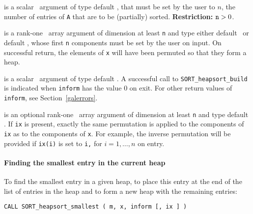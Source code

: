 \documentclass{galahad}
\newcommand{\packagename}{SORT}
\begin{document}
\vspace*{-3mm}
\begin{description}
 is a scalar \intentin\ argument of type default
\integer, that must be set by the user to $n$, the 
number of entries of {\tt A} that are to be (partially) sorted. 
{\bf Restriction:} ${\tt n} > 0$. 
 
 is a rank-one \intentinout\ array argument of
dimension at least {\tt n} and type either default
\integer\ or default \realdp, whose first {\tt n} components  must be set by
the user on input. On successful return, the elements of {\tt x} will have 
been permuted so that they form a heap. 
 
 is a scalar \intentout\ argument of type default \integer.
A successful call to {\tt \packagename\_heapsort\_build}
is indicated when {\tt inform} has the value 0 on exit.
For other return values of {\tt inform}, see Section~\ref{galerrors}.

 is an optional rank-one \intentinout\ array argument of
dimension at least {\tt n} and type default \integer.
If {\tt ix} is present, exactly the same permutation is applied to the 
components of {\tt ix} as to the components of {\tt x}. 
For example, the inverse permutation will be 
provided if {\tt ix(i)} is set to {\tt i,} for $i = 1, \ldots, n$
on entry. 
 
\end{description}


\paragraph{Finding the smallest entry in the current heap}


To find the smallest entry in a given heap, 
to place this entry at the end of the list of entries in the heap and 
to form a new heap with the remaining entries:
 
\hspace{8mm}
{\tt CALL \packagename\_heapsort\_smallest ( m, x, inform [, ix ] )}
\end{document}
